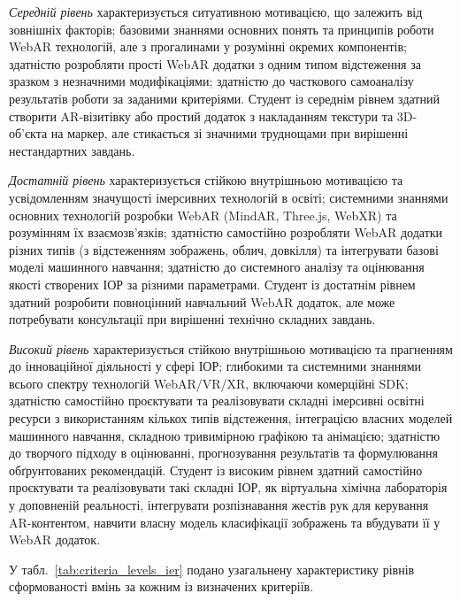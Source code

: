 \textit{Середній рівень} характеризується ситуативною мотивацією, що залежить від зовнішніх факторів; базовими знаннями основних понять та принципів роботи WebAR технологій, але з прогалинами у розумінні окремих компонентів; здатністю розробляти прості WebAR додатки з одним типом відстеження за зразком з незначними модифікаціями; здатністю до часткового самоаналізу результатів роботи за заданими критеріями. Студент із середнім рівнем здатний створити AR-візитівку або простий додаток з накладанням текстури та 3D-об'єкта на маркер, але стикається зі значними труднощами при вирішенні нестандартних завдань.

\textit{Достатній рівень} характеризується стійкою внутрішньою мотивацією та усвідомленням значущості імерсивних технологій в освіті; системними знаннями основних технологій розробки WebAR (MindAR, Three.js, WebXR) та розумінням їх взаємозв'язків; здатністю самостійно розробляти WebAR додатки різних типів (з відстеженням зображень, облич, довкілля) та інтегрувати базові моделі машинного навчання; здатністю до системного аналізу та оцінювання якості створених ІОР за різними параметрами. Студент із достатнім рівнем здатний розробити повноцінний навчальний WebAR додаток, але може потребувати консультації при вирішенні технічно складних завдань.

\textit{Високий рівень} характеризується стійкою внутрішньою мотивацією та прагненням до інноваційної діяльності у сфері ІОР; глибокими та системними знаннями всього спектру технологій WebAR/VR/XR, включаючи комерційні SDK; здатністю самостійно проєктувати та реалізовувати складні імерсивні освітні ресурси з використанням кількох типів відстеження, інтеграцією власних моделей машинного навчання, складною тривимірною графікою та анімацією; здатністю до творчого підходу в оцінюванні, прогнозування результатів та формулювання обґрунтованих рекомендацій. Студент із високим рівнем здатний самостійно проєктувати та реалізовувати такі складні ІОР, як віртуальна хімічна лабораторія у доповненій реальності, інтегрувати розпізнавання жестів рук для керування AR-контентом, навчити власну модель класифікації зображень та вбудувати її у WebAR додаток.

У табл.~\ref{tab:criteria_levels_ier} подано узагальнену характеристику рівнів сформованості вмінь за кожним із визначених критеріїв.

